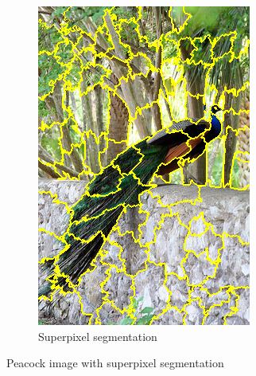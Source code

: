 \begin{figure}
\begin{subfigure}[t]{0.48\textwidth}
        \includegraphics[width=.7\linewidth]{figuras/lime/experiments/peacock_lime_segmentation.png}
        \caption{Superpixel segmentation}
    \end{subfigure}

    \caption{Peacock image with superpixel segmentation}
\end{figure}


